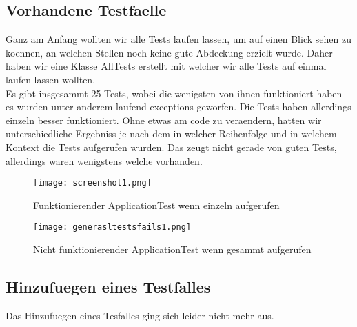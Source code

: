\documentclass[a4paper]{article}
\begin{document}
\subsection{Vorhandene Testfaelle}
Ganz am Anfang wollten wir alle Tests laufen lassen, um auf einen Blick sehen zu koennen, an welchen Stellen noch keine gute Abdeckung erzielt wurde. Daher haben wir eine Klasse AllTests erstellt mit welcher wir alle Tests auf einmal laufen lassen wollten.\\
Es gibt insgesammt 25 Tests, wobei die wenigsten von ihnen funktioniert haben - es wurden unter anderem laufend exceptions geworfen. Die Tests haben allerdings einzeln besser funktioniert. Ohne etwas am code zu veraendern, hatten wir unterschiedliche Ergebniss je nach dem in welcher Reihenfolge und in welchem Kontext die Tests aufgerufen wurden. Das zeugt nicht gerade von guten Tests, allerdings waren wenigstens welche vorhanden.
\begin{figure}[here!]
	\centering
	\texttt{[image: screenshot1.png]}
	\caption{Funktionierender ApplicationTest wenn einzeln aufgerufen}
	\end{figure}
    
    \begin{figure}[here!]
	\centering
	\texttt{[image: generasltestsfails1.png]}
	\caption{Nicht funktionierender ApplicationTest wenn gesammt aufgerufen}
	\end{figure}
     
\subsection{Hinzufuegen eines Testfalles}
Das Hinzufuegen eines Tesfalles ging sich leider nicht mehr aus. 
\newpage
\end{document}
